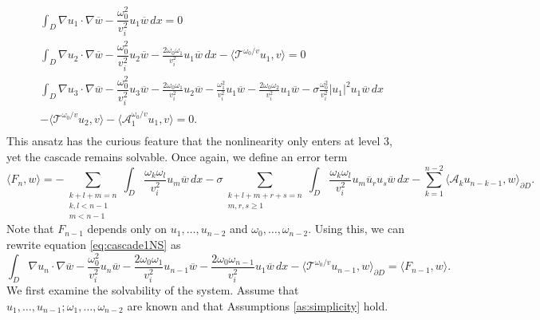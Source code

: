 \documentclass[a4paper,reqno,twoside]{amsart}
\numberwithin{equation}{section}
\theoremstyle{definition}
\newcommand{\<}{\ensuremath \leq}
\renewcommand{\>}{\ensuremath \geq}
\begin{document}
\begin{equation}
    \begin{aligned}
    &\int_{D} \nabla u_1 \cdot \nabla \overline{w} -\dfrac{\omega_0^2}{v_i^2} u_1\overline{w}  \, dx  = 0\\
    &\int_{D} \nabla u_2 \cdot \nabla \overline{w} -\dfrac{\omega_0^2}{v_i^2} u_2\overline{w}  -\frac{2\omega_0\omega_1}{v_i^2}u_1\overline{w} \, dx -\langle \mathcal{T}^{\omega_0/v}u_1,v\rangle= 0\\
    &\int_{D} \nabla u_3 \cdot \nabla \overline{w} -\dfrac{\omega_0^2}{v_i^2} u_3\overline{w}-\frac{2\omega_0\omega_1}{v_i^2}u_2\overline{w} -\frac{\omega_1^2}{v_i^2}u_1\overline{w}-\frac{2\omega_0\omega_2}{v_i^2}u_1\overline{w}- \sigma\frac{\omega_0^2}{v_i^2}\lvert u_1\rvert^2u_1\overline{w} \, dx\\
    &-\langle \mathcal{T}^{\omega_0/v}u_2,v\rangle-\langle \mathcal{A}_1^{\omega_0/v}u_1,v\rangle= 0.\\
\end{aligned}
\end{equation}
This ansatz has the curious feature that the nonlinearity only enters at level $3$, yet the cascade remains solvable. Once again, we define an error term
\begin{equation}\label{eq:cascade1.5NS}
    \langle F_{n},w\rangle = 
    - \sum_{\substack{k + l + m = n \\ k,l< n-1\\m< n-1}}\int_D \dfrac{\omega_k\omega_l}{v_i^2} u_m \overline{w} \, dx- \sigma \sum_{\substack{k+l+m+r+s=n\\m,r,s\geq 1}}\int_D \dfrac{\omega_k\omega_l}{v_i^2}u_m\overline{u}_r u_s\overline{w} \, dx - \sum_{k=1}^{n-2}\langle\mathcal{A}_k u_{n-k-1},w\rangle_{\partial D}.
\end{equation}
Note that $F_{n-1}$ depends only on $u_1, \dots, u_{n-2}$ and $\omega_0,\dots,\omega_{n-2}$. Using this, we can rewrite equation \eqref{eq:cascade1NS} as
\begin{equation}\label{eq:cascade2NS}
    \int_{D} \nabla u_n \cdot \nabla \overline{w}
    - \dfrac{\omega_0^2}{v_i^2}u_n\overline{w}- \dfrac{2\omega_0\omega_1}{v_i^2}u_{n-1}\overline{w} - \frac{2\omega_0\omega_{n-1}}{v_i^2}u_1\overline{w}\, dx - \langle\mathcal{T}^{\omega_0/v}u_{n-1},w\rangle_{\partial D} =  \langle F_{n-1},w\rangle.
\end{equation}
We first examine the solvability of the system. Assume that $u_1,\dots,u_{n-1};\omega_1,\dots,\omega_{n-2}$ are known and that Assumptions \ref{as:simplicity} hold.
\end{document}
